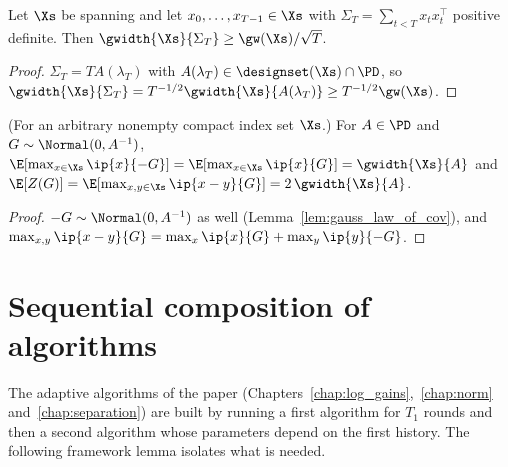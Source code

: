 \begin{lemma}\label{lem:width_empirical}
\leanok
{}
Let $\Xs$ be spanning and let $x_0,\dots,x_{T-1} \in \Xs$ with $\Sigma_T = \sum_{t<T} x_tx_t^\top$ positive definite.
Then $\gwidth{\Xs}{\Sigma_T} \ge \gw(\Xs)/\sqrt T$.
\end{lemma}

\begin{proof}
\leanok
{}
$\Sigma_T = T A(\lambda_T)$ with $A(\lambda_T) \in \designset(\Xs)\cap\PD$, so
$\gwidth{\Xs}{\Sigma_T} = T^{-1/2}\gwidth{\Xs}{A(\lambda_T)} \ge T^{-1/2}\gw(\Xs)$.
\end{proof}

\begin{lemma}\label{lem:width_symm}
\leanok
{}
(For an arbitrary nonempty compact index set $\Xs$.) For $A \in \PD$ and $G \sim \Normal(0,A^{-1})$,
$\E[\max_{x\in\Xs}\ip{x}{-G}] = \E[\max_{x\in\Xs}\ip{x}{G}] = \gwidth{\Xs}{A}$ and
$\E[Z(G)] = \E[\max_{x,y\in\Xs}\ip{x-y}{G}] = 2\,\gwidth{\Xs}{A}$.
\end{lemma}

\begin{proof}
\leanok
{}
$-G \sim \Normal(0,A^{-1})$ as well (Lemma~\ref{lem:gauss_law_of_cov}), and
$\max_{x,y}\ip{x-y}{G} = \max_x\ip{x}{G} + \max_y\ip{y}{-G}$.
\end{proof}

\section{Sequential composition of algorithms}
\label{sec:model_composition}

The adaptive algorithms of the paper (Chapters~\ref{chap:log_gains},~\ref{chap:norm}
and~\ref{chap:separation}) are built by running a first algorithm for $T_1$ rounds and then
a second algorithm whose parameters depend on the first history. The following framework
lemma isolates what is needed.

